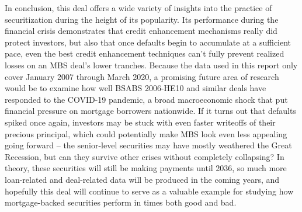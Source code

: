 \documentclass[12pt]{article}
\begin{document}
In conclusion, this deal offers a wide variety of insights into the practice of securitization during the height of its popularity. Its performance during the financial crisis demonstrates that credit enhancement mechanisms really did protect investors, but also that once defaults begin to accumulate at a sufficient pace, even the best credit enhancement techniques can’t fully prevent realized losses on an MBS deal’s lower tranches. Because the data used in this report only cover January 2007 through March 2020, a promising future area of research would be to examine how well BSABS 2006-HE10 and similar deals have responded to the COVID-19 pandemic, a broad macroeconomic shock that put financial pressure on mortgage borrowers nationwide. If it turns out that defaults spiked once again, investors may be stuck with even faster writeoffs of their precious principal, which could potentially make MBS look even less appealing going forward – the senior-level securities may have mostly weathered the Great Recession, but can they survive other crises without completely collapsing? In theory, these securities will still be making payments until 2036, so much more loan-related and deal-related data will be produced in the coming years, and hopefully this deal will continue to serve as a valuable example for studying how mortgage-backed securities perform in times both good and bad.

\newpage

\nocite{*}
\printbibliography
\end{document}
